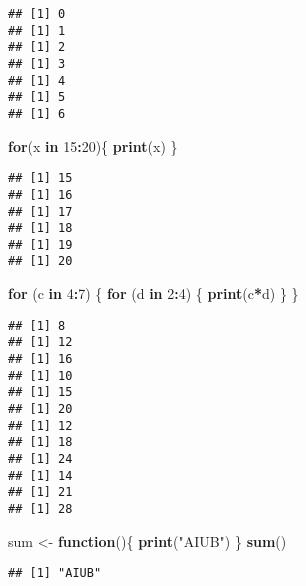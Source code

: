\documentclass[
]{article}
\newenvironment{Shaded}{\begin{snugshade}}{\end{snugshade}}
\newcommand{\ControlFlowTok}[1]{\textcolor[rgb]{0.13,0.29,0.53}{\textbf{#1}}}
\newcommand{\DecValTok}[1]{\textcolor[rgb]{0.00,0.00,0.81}{#1}}
\newcommand{\FunctionTok}[1]{\textcolor[rgb]{0.13,0.29,0.53}{\textbf{#1}}}
\newcommand{\NormalTok}[1]{#1}
\newcommand{\OtherTok}[1]{\textcolor[rgb]{0.56,0.35,0.01}{#1}}
\newcommand{\SpecialCharTok}[1]{\textcolor[rgb]{0.81,0.36,0.00}{\textbf{#1}}}
\newcommand{\StringTok}[1]{\textcolor[rgb]{0.31,0.60,0.02}{#1}}
\begin{document}
\begin{verbatim}
## [1] 0
## [1] 1
## [1] 2
## [1] 3
## [1] 4
## [1] 5
## [1] 6
\end{verbatim}

\begin{Shaded}
\begin{Highlighting}[]
\ControlFlowTok{for}\NormalTok{(x }\ControlFlowTok{in} \DecValTok{15}\SpecialCharTok{:}\DecValTok{20}\NormalTok{)\{}
    \FunctionTok{print}\NormalTok{(x)}
\NormalTok{\}}
\end{Highlighting}
\end{Shaded}

\begin{verbatim}
## [1] 15
## [1] 16
## [1] 17
## [1] 18
## [1] 19
## [1] 20
\end{verbatim}

\begin{Shaded}
\begin{Highlighting}[]
\ControlFlowTok{for}\NormalTok{ (c }\ControlFlowTok{in} \DecValTok{4}\SpecialCharTok{:}\DecValTok{7}\NormalTok{) \{}
    \ControlFlowTok{for}\NormalTok{ (d }\ControlFlowTok{in} \DecValTok{2}\SpecialCharTok{:}\DecValTok{4}\NormalTok{) \{}
        \FunctionTok{print}\NormalTok{(c}\SpecialCharTok{*}\NormalTok{d)}
\NormalTok{    \}}
\NormalTok{\}}
\end{Highlighting}
\end{Shaded}

\begin{verbatim}
## [1] 8
## [1] 12
## [1] 16
## [1] 10
## [1] 15
## [1] 20
## [1] 12
## [1] 18
## [1] 24
## [1] 14
## [1] 21
## [1] 28
\end{verbatim}

\begin{Shaded}
\begin{Highlighting}[]
\NormalTok{sum }\OtherTok{\textless{}{-}} \ControlFlowTok{function}\NormalTok{()\{}
    \FunctionTok{print}\NormalTok{(}\StringTok{"AIUB"}\NormalTok{)}
\NormalTok{\}}
\FunctionTok{sum}\NormalTok{()}
\end{Highlighting}
\end{Shaded}

\begin{verbatim}
## [1] "AIUB"
\end{verbatim}
\end{document}
